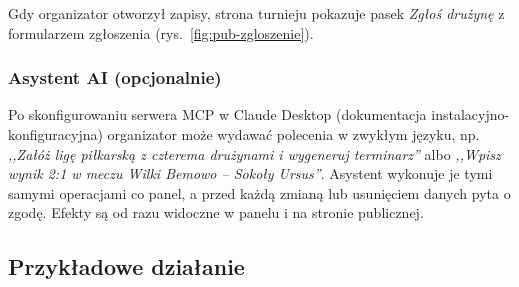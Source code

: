 \documentclass[11pt,a4paper,oneside]{article}
\newif\ifpodpowiedzi
\newcommand{\podpowiedz}[1]{\ifpodpowiedzi\par\begingroup\small\color{hintcolor}\textit{Wskazówka: #1}\par\endgroup\fi}
\begin{document}
Gdy organizator otworzył zapisy, strona turnieju pokazuje pasek \emph{Zgłoś drużynę} z formularzem zgłoszenia (rys.~\ref{fig:pub-zgloszenie}).


\subsubsection*{Asystent AI (opcjonalnie)}
Po skonfigurowaniu serwera MCP w Claude Desktop (dokumentacja instalacyjno-konfiguracyjna) organizator może wydawać polecenia w zwykłym języku, np. \emph{,,Załóż ligę piłkarską z czterema drużynami i wygeneruj terminarz''} albo \emph{,,Wpisz wynik 2:1 w meczu Wilki Bemowo -- Sokoły Ursus''}. Asystent wykonuje je tymi samymi operacjami co panel, a przed każdą zmianą lub usunięciem danych pyta o zgodę. Efekty są od razu widoczne w panelu i na stronie publicznej.

\podpowiedz{Dodaj czytelne zrzuty ekranu lub ilustracje tam, gdzie pomagają wykonać zadanie. Każdy rysunek powinien mieć podpis i odwołanie w tekście przez \texttt{\textbackslash ref}. Nie zastępuj instrukcji samymi obrazami.}

\clearpage
\subsection{Przykładowe działanie}
\podpowiedz{Przedstaw konkretne scenariusze najważniejszych zadań. Dla każdego podaj cel, warunki początkowe, przykładowe dane, kolejne kroki i oczekiwany rezultat. Przykład powinien być możliwy do odtworzenia. Powielaj poniższy blok według potrzeb.}
\end{document}
